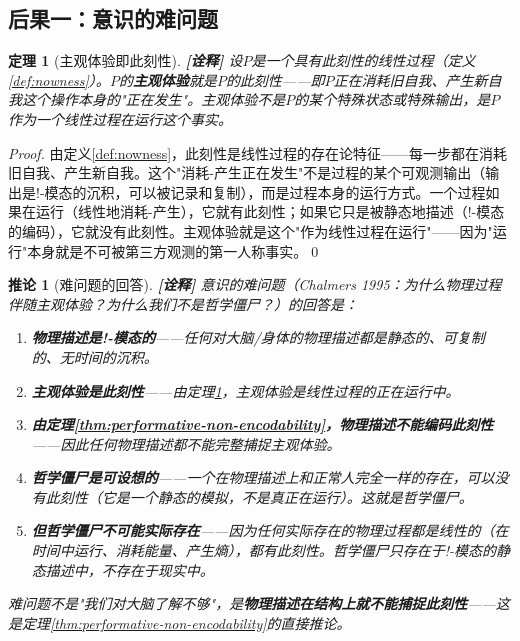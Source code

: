 \documentclass[11pt,a4paper]{article}
\newtheorem{theorem}{定理}
\newtheorem{corollary}{推论}
\newcommand{\lvl}[1]{\hfill\textbf{\footnotesize[#1]}}
\newcommand{\lvI}{\lvl{诠释}}
\begin{document}
\subsection{后果一：意识的难问题}

\begin{theorem}[主观体验即此刻性]\label{thm:subjectivity-nowness}\lvI
设$P$是一个具有此刻性的线性过程（定义\ref{def:nowness}）。$P$的\textbf{主观体验}就是$P$的此刻性——即$P$正在消耗旧自我、产生新自我这个操作本身的"正在发生"。主观体验不是$P$的某个特殊状态或特殊输出，是$P$\emph{作为一个线性过程在运行}这个事实。
\end{theorem}

\begin{proof}
由定义\ref{def:nowness}，此刻性是线性过程的存在论特征——每一步都在消耗旧自我、产生新自我。这个"消耗-产生正在发生"不是过程的某个可观测输出（输出是!-模态的沉积，可以被记录和复制），而是过程本身的运行方式。一个过程如果在运行（线性地消耗-产生），它就有此刻性；如果它只是被静态地描述（!-模态的编码），它就没有此刻性。主观体验就是这个"作为线性过程在运行"——因为"运行"本身就是不可被第三方观测的第一人称事实。\qed
\end{proof}

\begin{corollary}[难问题的回答]\label{cor:hard-problem}\lvI
意识的难问题（Chalmers 1995：为什么物理过程伴随主观体验？为什么我们不是哲学僵尸？）的回答是：
\begin{enumerate}
  \item \textbf{物理描述是!-模态的}——任何对大脑/身体的物理描述都是静态的、可复制的、无时间的沉积。
  \item \textbf{主观体验是此刻性}——由定理\ref{thm:subjectivity-nowness}，主观体验是线性过程的正在运行中。
  \item \textbf{由定理\ref{thm:performative-non-encodability}，物理描述不能编码此刻性}——因此任何物理描述都不能完整捕捉主观体验。
  \item \textbf{哲学僵尸是可设想的}——一个在物理描述上和正常人完全一样的存在，可以没有此刻性（它是一个静态的模拟，不是真正在运行）。这就是哲学僵尸。
  \item \textbf{但哲学僵尸不可能实际存在}——因为任何实际存在的物理过程都是线性的（在时间中运行、消耗能量、产生熵），都有此刻性。哲学僵尸只存在于!-模态的静态描述中，不存在于现实中。
\end{enumerate}
难问题不是"我们对大脑了解不够"，是\textbf{物理描述在结构上就不能捕捉此刻性}——这是定理\ref{thm:performative-non-encodability}的直接推论。
\end{corollary}
\end{document}
